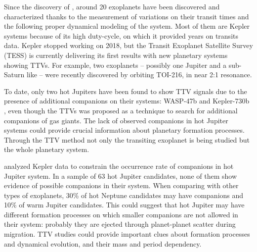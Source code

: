 Since the discovery of \cite{Holman2010}, around 20 exoplanets have been discovered and characterized thanks to the measurement of variations on their transit times and the following proper dynamical modeling of the system. Most of them are Kepler systems because of its high duty-cycle, on which it provided years on transits data. Kepler stopped working on 2018, but the Transit Exoplanet Satellite Survey (TESS) is currently delivering its first results with new planetary systems showing TTVs.  For example, two exoplanets -- possibly one Jupiter and a sub-Saturn like -- were recently discovered by \cite{Dawson2019} orbiting TOI-216, in near 2:1 resonance. 

To date, only two hot Jupiters have been found to show TTV signals due to the presence of additional companions on their systems: WASP-47b \citep{Becker2015} and Kepler-730b \citep{Canas2019}, even though the TTVs was proposed as a technique to search for additional companions of gas giants. The lack of observed companions in hot Jupiter systems could provide crucial information about planetary formation processes. Through the TTV method not only the transiting exoplanet is being studied but the whole planetary system. 

\cite{Steffen2012b} analyzed Kepler data to constrain the occurrence rate of companions in hot Jupiter system. In a sample of 63 hot Jupiter candidates, none of them show evidence of possible companions in their system. When comparing with other types of exoplanets, 30\% of hot Neptune candidates may have companions and 10\% of warm Jupiter candidates. This could suggest that hot Jupiter may have different formation processes on which smaller companions are not allowed in their system: probably they are ejected through planet-planet scatter during migration. TTV studies could provide important clues about formation processes and dynamical evolution, and their mass and period dependency. 